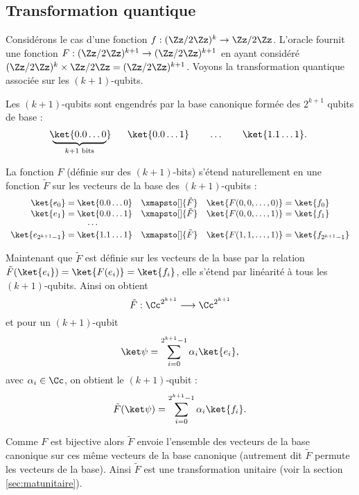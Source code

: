 \documentclass[11pt,class=report,crop=false]{standalone}
\begin{document}
\subsection{Transformation quantique}

Considérons le cas d'une fonction $f : (\Zz/2\Zz)^k \to \Zz/2\Zz$. 
L'oracle fournit une fonction $F : (\Zz/2\Zz)^{k+1}  \to (\Zz/2\Zz)^{k+1}$ en ayant considéré $(\Zz/2\Zz)^k \times \Zz/2\Zz = (\Zz/2\Zz)^{k+1}$.
Voyons la transformation quantique associée sur les $(k+1)$-qubits.

Les $(k+1)$-qubits sont engendrés par la base canonique formée des $2^{k+1}$ qubits de base :
$$\underbrace{\!\!\ket{0.0 \ldots 0}\!\!\!}_{k+1 \text{ bits}} \qquad \ket{0.0 \ldots 1} \qquad \ldots \qquad \ket{1.1 \ldots 1}.$$

La fonction $F$ (définie sur des $(k+1)$-bits) s'étend naturellement en une fonction $\tilde F$ sur les vecteurs de la base des $(k+1)$-qubits :
$$\begin{array}{rcl}
\ket{e_0} = \ket{0.0 \ldots 0} &\xmapsto[]{\tilde F}& \ket{F(0,0,\ldots,0)} = \ket{f_0} \\
\ket{e_1} = \ket{0.0 \ldots 1} &\xmapsto[]{\tilde F}& \ket{F(0,0,\ldots,1)} = \ket{f_1} \\
\cdots \qquad\qquad && \\
\ket{e_{2^{k+1}-1}} = \ket{1.1 \ldots 1} &\xmapsto[]{\tilde F}& \ket{F(1,1,\ldots,1)} = \ket{f_{2^{k+1}-1}} \\
\end{array}$$

Maintenant que $\tilde F$ est définie sur les vecteurs de la base par la relation $\tilde F(\ket{e_i}) = \ket{F(e_i)} = \ket{f_i}$, elle s'étend par linéarité à tous les $(k+1)$-qubits. Ainsi on obtient 
$$\tilde F : \Cc^{2^{k+1}} \longrightarrow \Cc^{2^{k+1}}$$
et pour un $(k+1)$-qubit 
$$\ket\psi = \sum_{i=0}^{2^{k+1}-1} \alpha_i \ket{e_i},$$
avec $\alpha_i \in \Cc$, 
on obtient le $(k+1)$-qubit :
$$\tilde F(\ket\psi) = \sum_{i=0}^{2^{k+1}-1} \alpha_i \ket{f_i}.$$

Comme $F$ est bijective alors $\tilde F$ envoie l'ensemble des vecteurs de la base canonique sur ces même vecteurs de la base canonique (autrement dit $\tilde F$ permute les vecteurs de la base). Ainsi $\tilde F$ est une transformation unitaire (voir la section \ref{sec:matunitaire}).
\end{document}
